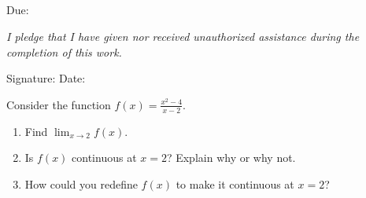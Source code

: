 \iflistingsavailable
{}



\fi



\begin{center}
    {\LARGE\bfseries\textcolor{problemcolor}{\coursename}} \\[0.5em]
    {\Large\assignmentnumber} \\[0.3em]
    {\large\studentname} \\
    \studentid \\[0.2em]
    {\large Due: \duedate}
\end{center}

\vspace{1em}

\noindent
\textit{I pledge that I have given nor received unauthorized assistance during the completion of this work.}

\vspace{0.5em}
\noindent
Signature: \underline{\hspace{3in}} \quad Date: \underline{\hspace{1.5in}}

\vspace{1.5em}


\begin{problem}
Consider the function $f(x) = \frac{x^2 - 4}{x - 2}$.

\begin{enumerate}[label=(\alph*)]
    \item Find $\lim_{x \to 2} f(x)$.
    \item Is $f(x)$ continuous at $x = 2$? Explain why or why not.
    \item How could you redefine $f(x)$ to make it continuous at $x = 2$?
\end{enumerate}
\end{problem}

